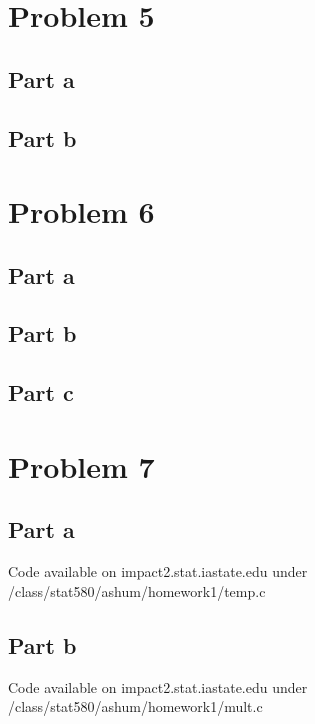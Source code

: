 \documentclass{article}\usepackage[]{graphicx}\usepackage[]{color}
\begin{document}
\section*{Problem 5}
\subsection*{Part a}
\subsection*{Part b}

\section*{Problem 6}
\subsection*{Part a}
\subsection*{Part b}
\subsection*{Part c}

\section*{Problem 7}
\subsection*{Part a}
Code available on impact2.stat.iastate.edu under /class/stat580/ashum/homework1/temp.c
\subsection*{Part b}
Code available on impact2.stat.iastate.edu under /class/stat580/ashum/homework1/mult.c
\end{document}
